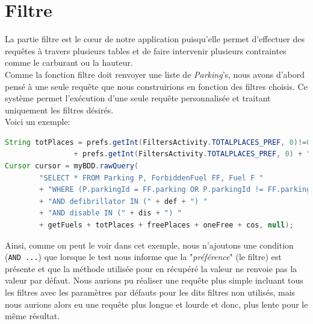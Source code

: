 \documentclass[a4paper,11pt]{article}
\begin{document}
\section{Filtre}
La partie filtre est le c\oe ur de notre application puisqu'elle permet d'effectuer des requêtes à travers plusieurs tables et de faire intervenir plusieurs contraintes comme le carburant ou la hauteur.\\
Comme la fonction filtre doit renvoyer une liste de \textit{Parking}'s, nous avons d'abord pensé à une seule requête que nous construirions en fonction des filtres choisis.  Ce système permet l'exécution d'une seule requête personnalisée et traitant uniquement les filtres désirés.\\
Voici un exemple:
\begin{lstlisting}[language=Java]
String totPlaces = prefs.getInt(FiltersActivity.TOTALPLACES_PREF, 0)!=0 ? "AND totalPlaces >= "
				+ prefs.getInt(FiltersActivity.TOTALPLACES_PREF, 0) + " " : "";
Cursor cursor = myBDD.rawQuery(
		"SELECT * FROM Parking P, ForbiddenFuel FF, Fuel F "
        + "WHERE (P.parkingId = FF.parking OR P.parkingId != FF.parking) "
        + "AND defibrillator IN (" + def + ") "
        + "AND disable IN (" + dis + ") "
		+ getFuels + totPlaces + freePlaces + oneFree + cos, null);
\end{lstlisting}

Ainsi, comme on peut le voir dans cet exemple, nous n'ajoutons une condition (\texttt{AND ...}) que lorsque le test nous informe que la "\textit{préférence}" (le filtre) est présente et que la méthode utilisée pour en récupéré la valeur ne renvoie pas la valeur par défaut.  Nous aurions pu réaliser une requête plus simple incluant tous les filtres avec les paramètres par défauts pour les dits filtres non utilisés, mais nous aurions alors eu une requête plus longue et lourde et donc, plus lente pour le même résultat.\\
\end{document}
